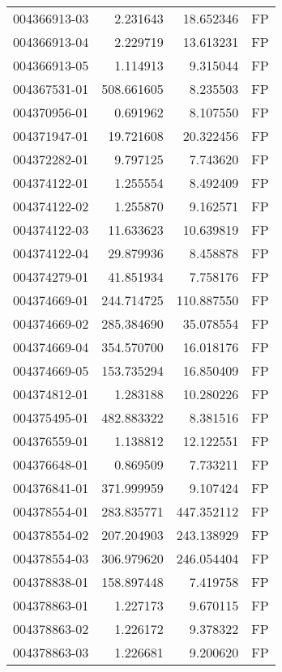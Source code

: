 \begin{tabular}{lrrl}
004366913-03 &    2.231643 &      18.652346 &   FP \\
004366913-04 &    2.229719 &      13.613231 &   FP \\
004366913-05 &    1.114913 &       9.315044 &   FP \\
004367531-01 &  508.661605 &       8.235503 &   FP \\
004370956-01 &    0.691962 &       8.107550 &   FP \\
004371947-01 &   19.721608 &      20.322456 &   FP \\
004372282-01 &    9.797125 &       7.743620 &   FP \\
004374122-01 &    1.255554 &       8.492409 &   FP \\
004374122-02 &    1.255870 &       9.162571 &   FP \\
004374122-03 &   11.633623 &      10.639819 &   FP \\
004374122-04 &   29.879936 &       8.458878 &   FP \\
004374279-01 &   41.851934 &       7.758176 &   FP \\
004374669-01 &  244.714725 &     110.887550 &   FP \\
004374669-02 &  285.384690 &      35.078554 &   FP \\
004374669-04 &  354.570700 &      16.018176 &   FP \\
004374669-05 &  153.735294 &      16.850409 &   FP \\
004374812-01 &    1.283188 &      10.280226 &   FP \\
004375495-01 &  482.883322 &       8.381516 &   FP \\
004376559-01 &    1.138812 &      12.122551 &   FP \\
004376648-01 &    0.869509 &       7.733211 &   FP \\
004376841-01 &  371.999959 &       9.107424 &   FP \\
004378554-01 &  283.835771 &     447.352112 &   FP \\
004378554-02 &  207.204903 &     243.138929 &   FP \\
004378554-03 &  306.979620 &     246.054404 &   FP \\
004378838-01 &  158.897448 &       7.419758 &   FP \\
004378863-01 &    1.227173 &       9.670115 &   FP \\
004378863-02 &    1.226172 &       9.378322 &   FP \\
004378863-03 &    1.226681 &       9.200620 &   FP \\

\end{tabular}
